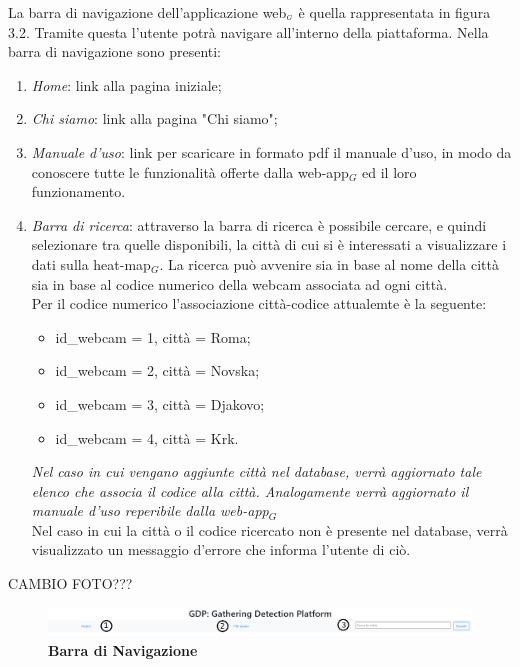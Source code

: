 La barra di navigazione dell'applicazione web$_{\scaleto{G}{3pt}}$ è quella rappresentata in figura 3.2. Tramite questa l'utente potrà navigare all'interno della piattaforma. Nella barra di navigazione sono presenti:
\begin{enumerate}
	\item \textit{Home}: link alla pagina iniziale;
	\item \textit{Chi siamo}: link alla pagina "Chi siamo";
	\item \textit{Manuale d'uso}: link per scaricare in formato pdf il manuale d'uso, in modo da conoscere tutte le funzionalità offerte dalla web-app$_G$ ed il loro funzionamento.
	\item \textit{Barra di ricerca}: attraverso la barra di ricerca è possibile cercare, e quindi selezionare tra quelle disponibili, la città di cui si è interessati a visualizzare i dati sulla heat-map$_G$. La ricerca può avvenire sia in base al nome della città sia in base al codice numerico della webcam associata ad ogni città. \\ 
	Per il codice numerico l'associazione città-codice attualemte è la seguente:
	\begin{itemize}
		\item id{\_}webcam = 1, città = Roma;
		\item id{\_}webcam = 2, città = Novska;
		\item id{\_}webcam = 3, città = Djakovo;
		\item id{\_}webcam = 4, città = Krk.
	\end{itemize}
	\textit{Nel caso in cui vengano aggiunte città nel database, verrà aggiornato tale elenco che associa il codice alla città. Analogamente verrà aggiornato il manuale d'uso reperibile dalla web-app$_G$} \\
	Nel caso in cui la città o il codice ricercato non è presente nel database, verrà visualizzato un messaggio d'errore che informa l'utente di ciò.
\end{enumerate}

CAMBIO FOTO???
\begin{center}
	\begin{figure}[H]
		\includegraphics[width=1\linewidth]{../immagini/manualeUtente/BarraDiNavigazioe.png}
		\caption{\textbf{Barra di Navigazione}}
	\end{figure}
\end{center}

